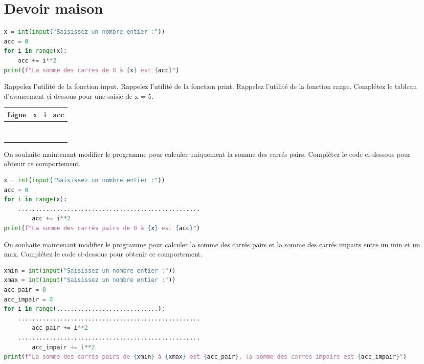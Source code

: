\section*{Devoir maison}

\begin{Exercise}[title={Somme des carrés}]

\begin{lstlisting}[style=pythonstyle, language=python]
x = int(input("Saisissez un nombre entier :"))
acc = 0
for i in range(x):
    acc += i**2
print(f"La somme des carres de 0 à {x} est {acc}")
\end{lstlisting}

\Question Rappelez l'utilité de la fonction input.
\Question Rappelez l'utilité de la fonction print.
\Question Rappelez l'utilité de la fonction range.
\Question Complétez le tableau d'avancement ci-dessous pour une saisie de x = 5.\\
\begin{center}
\large
\begin{tabular}{c|c|c|c|}
\textbf{Ligne} & \textbf{x} & \textbf{i} & \textbf{acc}  \\
\hline
 &  &  & \\
 &  &  & \\
 &  &  & \\
 &  &  & \\
 &  &  & \\
 &  &  & \\
 &  &  & \\
 &  &  & \\
\end{tabular}
\end{center}

\Question On souhaite maintenant modifier le programme pour calculer uniquement la somme des carrés pairs. Complétez le code ci-dessous pour obtenir ce comportement.
\begin{lstlisting}[style=pythonstyle, language=python]
x = int(input("Saisissez un nombre entier :"))
acc = 0
for i in range(x):
    ....................................................
        acc += i**2
print(f"La somme des carrés pairs de 0 à {x} est {acc}")
\end{lstlisting}

\Question On souhaite maintenant modifier le programme pour calculer la somme des carrés pairs  et la somme des carrés impairs entre un min et un max. Complétez le code ci-dessous pour obtenir ce comportement.
\begin{lstlisting}[style=pythonstyle, language=python]
xmin = int(input("Saisissez un nombre entier :"))
xmax = int(input("Saisissez un nombre entier :"))
acc_pair = 0
acc_impair = 0
for i in range(.............................):
    ....................................................
        acc_pair += i**2
    ....................................................
        acc_impair += i**2
print(f"La somme des carrés pairs de {xmin} à {xmax} est {acc_pair}, la somme des carrés impairs est {acc_impair}")
\end{lstlisting}
\end{Exercise}